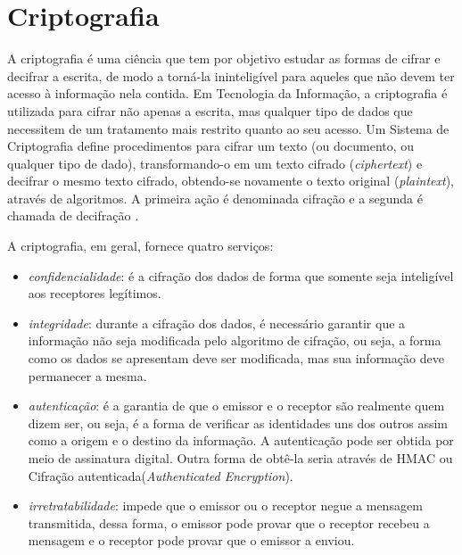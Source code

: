 %
%
\section{Criptografia} \label{sec:criptografia}
A criptografia é uma ciência que tem por objetivo estudar as formas de cifrar e decifrar a escrita, de modo a torná-la ininteligível para aqueles que não devem ter acesso à informação nela contida. Em Tecnologia da Informação, a criptografia é utilizada para cifrar não apenas a escrita, mas qualquer tipo de dados que necessitem de um tratamento mais restrito quanto ao seu acesso. Um Sistema de Criptografia define procedimentos para cifrar um texto (ou documento, ou qualquer tipo de dado), transformando-o em um texto cifrado (\textit{ciphertext}) e decifrar o mesmo texto cifrado, obtendo-se novamente o texto original (\textit{plaintext}), através de algoritmos. A primeira ação é denominada cifração e a segunda é chamada de decifração \cite{Portnoi:2005}.

A criptografia, em geral, fornece quatro serviços: \cite{Portnoi:2005}

\begin{itemize}
\item \textit{confidencialidade}: é a cifração dos dados de forma que somente seja inteligível aos receptores legítimos.
\item \textit{integridade}: durante a cifração dos dados, é necessário garantir que a informação não seja modificada pelo algoritmo de cifração, ou seja, a forma como os dados se apresentam deve ser modificada, mas sua informação deve permanecer a mesma.
\item \textit{autenticação}: é a garantia de que o emissor e o receptor são realmente quem dizem ser, ou seja, é a forma de verificar as identidades uns dos outros assim como a origem e o destino da informação. A autenticação pode ser obtida por meio de assinatura digital. Outra forma de obtê-la seria através de HMAC ou Cifração autenticada(\textit{Authenticated Encryption}).
\item \textit{irretratabilidade}: impede que o emissor ou o receptor negue a mensagem transmitida, dessa forma, o emissor pode provar que o receptor recebeu a mensagem e o receptor pode provar que o emissor a enviou.
\end{itemize}

%
%
